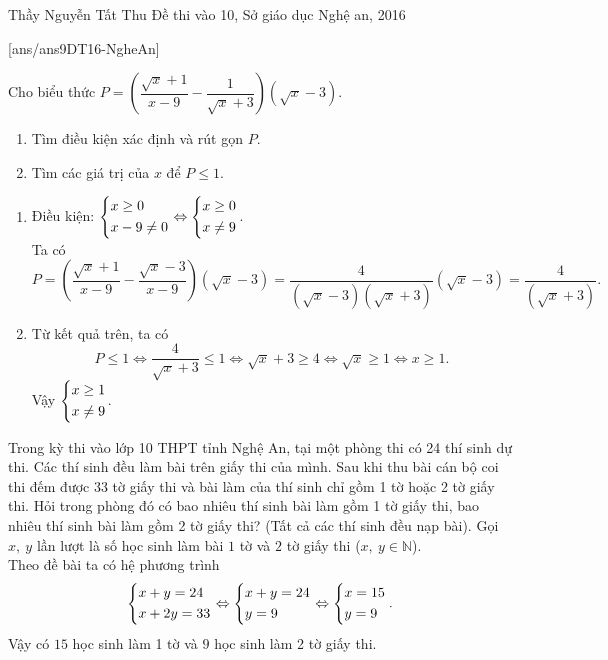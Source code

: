 \begin{name}
{Thầy  Nguyễn Tất Thu}
{Đề thi vào 10, Sở giáo dục Nghệ an, 2016}
\end{name}
\setcounter{ex}{0}
[ans/ans9DT16-NgheAn]
\begin{ex}%
   Cho biểu thức $P=\left( \dfrac{\sqrt{x}+1}{x-9}-\dfrac{1}{\sqrt{x}+3} \right)(\sqrt{x}-3)$.
   \begin{enumerate}
   \item Tìm điều kiện xác định và rút gọn $P$.
\item Tìm các giá trị của $x$ để $P\le 1$.
   \end{enumerate}
\loigiai
    {\begin{enumerate}
    \item Điều kiện: $\left\{\begin{aligned}&x \geq 0 \\& x-9 \neq 0\end{aligned}\right.\Leftrightarrow \left\{\begin{aligned}&x\geq 0\\& x \neq 9\end{aligned}\right.$.\\
    Ta có $$P=\left(\dfrac{\sqrt{x}+1}{x-9}-\dfrac{\sqrt{x}-3}{x-9} \right) \left(\sqrt{x} -3\right)=\dfrac{4}{\left(\sqrt{x} -3\right)\left(\sqrt{x} +3\right)}\left(\sqrt{x} -3\right)=\dfrac{4}{\left(\sqrt{x} +3\right)}.$$
        \item 
    Từ kết quả trên, ta có $$P \leq 1 \Leftrightarrow \dfrac{4}{\sqrt{x}+3}\leq 1 \Leftrightarrow \sqrt{x}+3 \geq 4 \Leftrightarrow \sqrt{x} \geq 1 \Leftrightarrow x\geq 1.$$
    Vậy $\left\{\begin{aligned}&x \geq 1 \\& x\ne 9 \end{aligned}\right.$.
    \end{enumerate}

    }
\end{ex}

\begin{ex}%
\hfill

Trong kỳ thi vào lớp 10 THPT tỉnh Nghệ An, tại một phòng thi có 24 thí sinh dự thi. Các thí sinh đều làm bài trên giấy thi của mình. Sau khi thu bài cán bộ coi thi đếm được 33 tờ giấy thi và bài làm của thí sinh chỉ gồm 1 tờ hoặc 2 tờ giấy thi. Hỏi trong phòng đó có bao nhiêu thí sinh bài làm gồm 1 tờ giấy thi, bao nhiêu thí sinh bài làm gồm 2 tờ giấy thi? (Tất cả các thí sinh đều nạp bài).
\loigiai
    { Gọi $x,\ y$ lần lượt là số học sinh làm bài $1$ tờ và $2$ tờ giấy thi ($x,\ y \in \mathbb{N}$).\\
    Theo đề bài ta có hệ phương trình
    $$\left\{\begin{aligned}&x+y=24 \\& x+2y=33\end{aligned}\right. \Leftrightarrow \left\{\begin{aligned}&x+y=24 \\& y=9 \end{aligned}\right. \Leftrightarrow \left\{\begin{aligned}&x=15 \\& y=9 \end{aligned}\right..$$
Vậy có $15$ học sinh làm 1 tờ và $9$ học sinh làm 2 tờ giấy thi.
    }
\end{ex}

